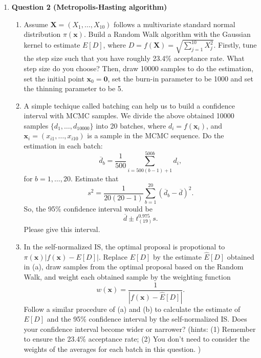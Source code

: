 \documentclass[notitlepage,a4paper,12pt]{article}%
\begin{document}
\begin{enumerate}

\item 
{\bf Question 2 (Metropolis-Hasting algorithm)}

\begin{enumerate} 
\item Assume $\mathbf{X}=(X_1,\dots,X_{10})$ follows a multivariate standard normal distribution $\pi(\mathbf{x})$. Build a Random Walk algorithm with the Gaussian kernel to estimate $E[D]$, where $D=f(\mathbf{X})=\sqrt{\sum_{j=1}^{10}X_j^2}$. Firstly, tune the step size such that you have roughly 23.4\% acceptance rate. What step size do you choose? Then, draw 10000 samples to do the estimation, set the initial point $\mathbf{x}_0=\mathbf{0}$, set the burn-in parameter to be 1000 and set the thinning parameter to be 5. 

\item A simple techique called batching can help us to build a confidence interval with MCMC samples. We divide the above obtained 10000 samples $\{d_1,\dots,d_{10000}\}$ into 20 batches, where $d_i=f(\mathbf{x}_i)$, and $\textbf{x}_i=(x_{i1},\dots,x_{i10})$ is a sample in the MCMC sequence. Do the estimation in each batch:
$$
\overline{d}_b=\frac{1}{500}\sum_{i=500(b-1)+1}^{500b}d_i,
$$
for $b=1,\dots,20$. Estimate that
$$
s^2=\frac{1}{20(20-1)}\sum_{b=1}^{20}(\overline{d}_b-\overline{d})^2. 
$$
So, the 95\% confidence interval would be
$$
\overline{d}\pm t_{(19)}^{0.975}s. 
$$
Please give this interval. 

\item In the self-normalized IS, the optimal proposal is propotional to $\pi(\mathbf{x})|f(\mathbf{x})-E[D]|$. Replace $E[D]$ by the estimate $\hat{E}[D]$ obtained in (a), draw samples from the optimal proposal based on the Random Walk, and weight each obtained sample by the weighting function 
$$
w(\mathbf{x})=\frac{1}{|f(\mathbf{x})-\hat{E}[D]|}. 
$$
Follow a similar procedure of (a) and (b) to calculate the estimate of $E[D]$ and the 95\% confidence interval by the self-normalized IS. Does your confidence interval become wider or narrower? (hints: (1) Remember to ensure the 23.4\% acceptance rate; (2) You don't need to consider the weights of the averages for each batch in this question. )

\end{enumerate}

\end{enumerate}
\end{document}
